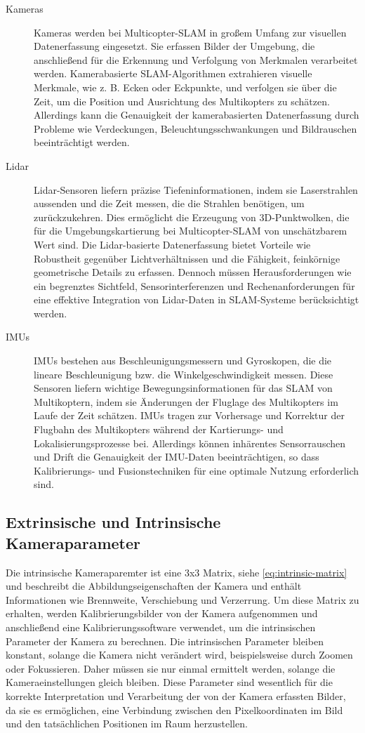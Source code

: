 \begin{description}
    \item[Kameras] Kameras werden bei Multicopter-SLAM in großem Umfang zur visuellen Datenerfassung eingesetzt. Sie erfassen Bilder der Umgebung, die anschließend für die Erkennung und Verfolgung von Merkmalen verarbeitet werden. Kamerabasierte SLAM-Algorithmen extrahieren visuelle Merkmale, wie z. B. Ecken oder Eckpunkte, und verfolgen sie über die Zeit, um die Position und Ausrichtung des Multikopters zu schätzen. Allerdings kann die Genauigkeit der kamerabasierten Datenerfassung durch Probleme wie Verdeckungen, Beleuchtungsschwankungen und Bildrauschen beeinträchtigt werden.
    \item[Lidar]Lidar-Sensoren liefern präzise Tiefeninformationen, indem sie Laserstrahlen aussenden und die Zeit messen, die die Strahlen benötigen, um zurückzukehren. Dies ermöglicht die Erzeugung von 3D-Punktwolken, die für die Umgebungskartierung bei Multicopter-SLAM von unschätzbarem Wert sind. Die Lidar-basierte Datenerfassung bietet Vorteile wie Robustheit gegenüber Lichtverhältnissen und die Fähigkeit, feinkörnige geometrische Details zu erfassen. Dennoch müssen Herausforderungen wie ein begrenztes Sichtfeld, Sensorinterferenzen und Rechenanforderungen für eine effektive Integration von Lidar-Daten in SLAM-Systeme berücksichtigt werden.
    \item[IMUs]IMUs bestehen aus Beschleunigungsmessern und Gyroskopen, die die lineare Beschleunigung bzw. die Winkelgeschwindigkeit messen. Diese Sensoren liefern wichtige Bewegungsinformationen für das SLAM von Multikoptern, indem sie Änderungen der Fluglage des Multikopters im Laufe der Zeit schätzen. IMUs tragen zur Vorhersage und Korrektur der Flugbahn des Multikopters während der Kartierungs- und Lokalisierungsprozesse bei. Allerdings können inhärentes Sensorrauschen und Drift die Genauigkeit der IMU-Daten beeinträchtigen, so dass Kalibrierungs- und Fusionstechniken für eine optimale Nutzung erforderlich sind.  
\end{description}


\subsection{Extrinsische und Intrinsische Kameraparameter}

Die intrinsische Kameraparemter ist eine 3x3 Matrix, siehe \ref{eq:intrinsic-matrix} und beschreibt die Abbildungseigenschaften der Kamera und enthält Informationen wie Brennweite, Verschiebung und Verzerrung. Um diese Matrix zu erhalten, werden Kalibrierungsbilder von der Kamera aufgenommen und anschließend eine Kalibrierungssoftware verwendet, um die intrinsischen Parameter der Kamera zu berechnen. Die intrinsischen Parameter bleiben konstant, solange die Kamera nicht verändert wird, beispielsweise durch Zoomen oder Fokussieren. Daher müssen sie nur einmal ermittelt werden, solange die Kameraeinstellungen gleich bleiben. Diese Parameter sind wesentlich für die korrekte Interpretation und Verarbeitung der von der Kamera erfassten Bilder, da sie es ermöglichen, eine Verbindung zwischen den Pixelkoordinaten im Bild und den tatsächlichen Positionen im Raum herzustellen.

